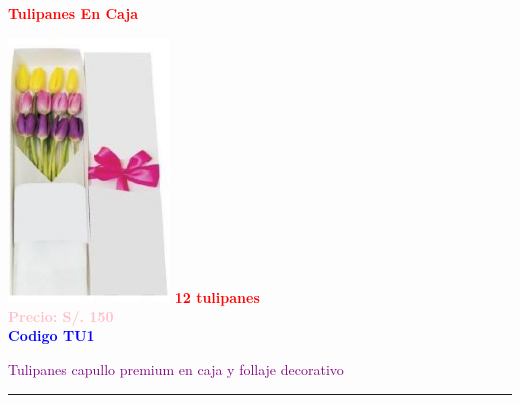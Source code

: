 
    \begin{center}
        \textbf{\Huge\textcolor{red}{Tulipanes En Caja}}
    \end{center}
    \begin{multicols}{2}

    \begin{minipage}{\linewidth}
        \centering
        \includegraphics[height=7cm]{imagenes_extraidas/image_2_3} %
        \newline
        \vspace{0.1cm}
        \textbf{\Large \textcolor{red}{12 tulipanes}} \\ %
        \vspace{0.2cm}
        \textbf{\textcolor{pink}{Precio: S/. 150}} \\ %
        \vspace{0.2cm}
        \textbf{\textcolor{blue}{Codigo TU1}} \\ %
        \vspace{0.2cm}
        \begin{minipage}{0.8\linewidth} 
            \small \textcolor{purple}{Tulipanes capullo premium en caja y follaje decorativo} %
        \end{minipage}
        \vspace{0.1cm}        
        \rule{\linewidth}{0.5pt}
    \end{minipage}
    

\end{multicols}
